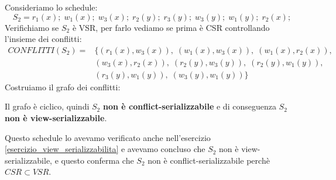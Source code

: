 \documentclass[a4paper]{article}
\begin{document}
\begin{example}
  Consideriamo lo schedule:
  \[
    S_2 = r_1(x); \; w_1(x); \; w_3(x); \; r_2(y); \; r_3(y); \; w_3(y); \; w_1(y); \;
    r_2(x);
  \] 
  Verifichiamo se \( S_2 \) è VSR, per farlo vediamo se prima è CSR controllando
  l'insieme dei conflitti:
  \[
    \begin{aligned}
      CONFLITTI(S_2) =& 
      \{
        (r_1(x), w_3(x)),\;
        (w_1(x), w_3(x)),\;
        (w_1(x), r_2(x)), \\
                             &(w_3(x), r_2(x)),\;
                             (r_2(y), w_3(y)),\;
                             (r_2(y), w_1(y)), \\
                             &(r_3(y), w_1(y)),\;
                             (w_3(y), w_1(y))
                           \} 
    \end{aligned}
  \]
  Costruiamo il grafo dei conflitti:
  \begin{figure}[H]
    \centering
  \end{figure}
  \noindent
  Il grafo è ciclico, quindi \( S_2 \) \textbf{non è conflict-serializzabile} e di
  conseguenza \( S_2 \) \textbf{non è view-serializzabile}.

  \vspace{1em}
  \noindent
  Questo schedule lo avevamo verificato anche nell'esercizio
  \ref{esercizio_view_serializzabilita} e avevamo concluso che \( S_2 \) non è
  view-serializzabile, e questo conferma che \( S_2 \) non è conflict-serializzabile
   perchè \( CSR \subset VSR \).
\end{example}
\end{document}
